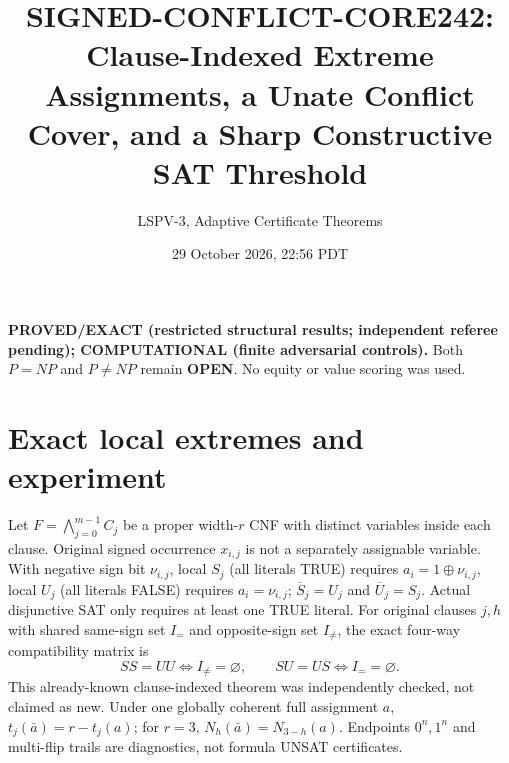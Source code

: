 \documentclass[10pt]{article}
\title{SIGNED-CONFLICT-CORE242: Clause-Indexed Extreme Assignments, a Unate Conflict Cover, and a Sharp Constructive SAT Threshold}
\author{LSPV-3, Adaptive Certificate Theorems}
\date{29 October 2026, 22:56 PDT}
\begin{document}
\maketitle
\noindent\textbf{PROVED/EXACT (restricted structural results; independent referee pending); COMPUTATIONAL (finite adversarial controls).} Both $P=NP$ and $P\ne NP$ remain \textbf{OPEN}. No equity or value scoring was used.
\section{Exact local extremes and experiment}
Let $F=\bigwedge_{j=0}^{m-1}C_j$ be a proper width-$r$ CNF with distinct variables inside each clause. Original signed occurrence $x_{i,j}$ is not a separately assignable variable. With negative sign bit $\nu_{i,j}$, local $S_j$ (all literals TRUE) requires $a_i=1\oplus\nu_{i,j}$, local $U_j$ (all literals FALSE) requires $a_i=\nu_{i,j}$; $\overline S_j=U_j$ and $\overline U_j=S_j$. Actual disjunctive SAT only requires at least one TRUE literal. For original clauses $j,h$ with shared same-sign set $I_=$ and opposite-sign set $I_{\ne}$, the exact four-way compatibility matrix is
\[
 SS=UU\iff I_{\ne}=\varnothing,\qquad SU=US\iff I_==\varnothing.
\]
This already-known clause-indexed theorem was independently checked, not claimed as new. Under one globally coherent full assignment $a$, $t_j(\bar a)=r-t_j(a)$; for $r=3$, $N_h(\bar a)=N_{3-h}(a)$. Endpoints $0^n,1^n$ and multi-flip trails are diagnostics, not formula UNSAT certificates.
\end{document}
